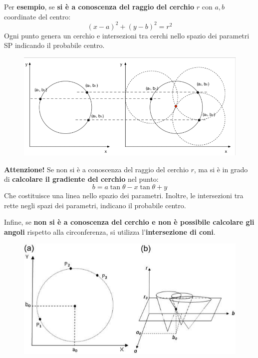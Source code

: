 \documentclass[a4paper]{article}
\begin{document}
	\noindent
	Per \textcolor{Green4}{\textbf{esempio}}, se \textbf{si è a conoscenza del raggio del cerchio} $r$ con $a,b$ coordinate del centro:
	\begin{equation*}
		\left(x-a\right)^{2} + \left(y-b\right)^{2} = r^{2}
	\end{equation*}
	Ogni punto genera un cerchio e intersezioni tra cerchi nello spazio dei parametri SP indicando il probabile centro.
	\begin{figure}[!htp]
		\centering
		\includegraphics[width=\textwidth]{img/trasformata_hough_cerchio.png}
	\end{figure}
	
	\noindent
	\textcolor{Green4}{\textbf{Attenzione!}} Se non si è a conoscenza del raggio del cerchio $r$, ma si è in grado di \textbf{calcolare il gradiente del cerchio} nel punto:
	\begin{equation*}
		b = a \tan\theta - x \tan\theta + y
	\end{equation*}
	Che costituisce una linea nello spazio dei parametri. Inoltre, le intersezioni tra rette negli spazi dei parametri, indicano il probabile centro.\newpage
	
	\noindent
	Infine, se \textbf{non si è a conoscenza del cerchio e non è possibile calcolare gli angoli} rispetto alla circonferenza, si utilizza l'\textbf{intersezione di coni}.
	\begin{figure}[!htp]
		\centering
		\includegraphics[width=.9\textwidth]{img/trasformata_hough_coni.png}
	\end{figure}\newpage
\end{document}
